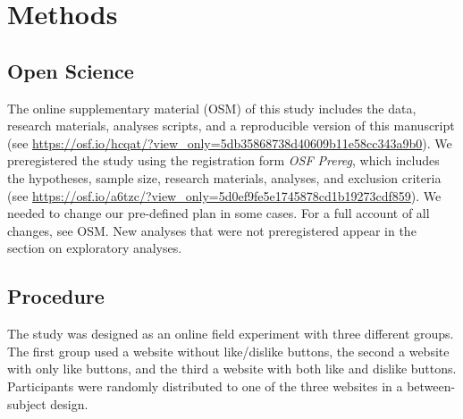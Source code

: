 \documentclass[
  english,
  man,floatsintext]{apa6}
\begin{document}
\hypertarget{methods}{%
\section{Methods}\label{methods}}

\hypertarget{open-science}{%
\subsection{Open Science}\label{open-science}}

The online supplementary material (OSM) of this study includes the data, research materials, analyses scripts, and a reproducible version of this manuscript (see \url{https://osf.io/hcqat/?view_only=5db35868738d40609b11e58cc343a9b0}).
We preregistered the study using the registration form \emph{OSF Prereg}, which includes the hypotheses, sample size, research materials, analyses, and exclusion criteria (see \url{https://osf.io/a6tzc/?view_only=5d0ef9fe5e1745878cd1b19273cdf859}).
We needed to change our pre-defined plan in some cases.
For a full account of all changes, see OSM.
New analyses that were not preregistered appear in the section on exploratory analyses.

\hypertarget{procedure}{%
\subsection{Procedure}\label{procedure}}

The study was designed as an online field experiment with three different groups.
The first group used a website without like/dislike buttons, the second a website with only like buttons, and the third a website with both like and dislike buttons.
Participants were randomly distributed to one of the three websites in a between-subject design.
\end{document}
